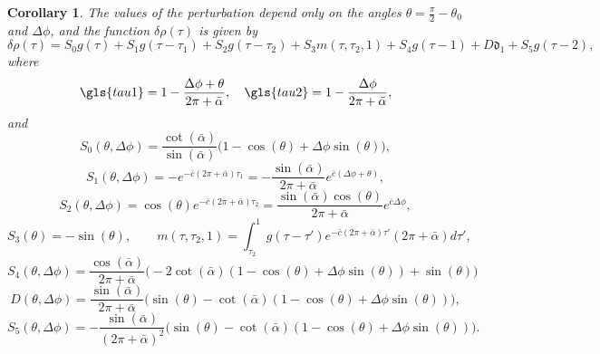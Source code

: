 \documentclass[reqno]{amsart}
\theoremstyle{definition} \newtheorem{definition}{Definition}[section]
\theoremstyle{definition} \newtheorem{remark}[definition]{Remark}
\theoremstyle{plain} \newtheorem{lemma}[definition]{Lemma}
\theoremstyle{plain} \newtheorem{proposition}[definition]{Proposition}
\theoremstyle{plain} \newtheorem{theorem}[definition]{Theorem}
\theoremstyle{plain} \newtheorem{corollary}[definition]{Corollary}
\theoremstyle{definition} \newtheorem{example}[definition]{Example}
\theoremstyle{plain} \newtheorem{claim}[clai]{Claim}
\theoremstyle{definition} \newtheorem{assumption}[definition]{Assumption}
\theoremstyle{definition} \newtheorem{observation}[definition]{Observation}
\newcommand{\1}{\mathbbm 1}
\newcommand{\Diracd}{\mathfrak{d}}
\numberwithin{equation}{section} %
\theoremstyle{plain} \newtheorem*{theorem*}{Theorem}
\theoremstyle{plain} \newtheorem{mthm}[maintheorem]{Main Theorem}
\theoremstyle{plain} \newtheorem*{mthm*}{Main Theorem}
\theoremstyle{plain} \newtheorem*{conjecture*}{Conjecture}
\theoremstyle{plain} \newtheorem{conjecture}[definition]{Conjecture}
\theoremstyle{plain} \newtheorem*{problem*}{Problem}
\begin{document}
\begin{corollary}
\label{Cor:arc_rho_eq}
The values of the perturbation depend only on the angles $\theta = \frac{\pi}{2} - \theta_0$ and $\Delta \phi$, and the function $\delta \rho(\tau)$ is given by
\begin{equation*}
\delta \rho(\tau) = S_0 g(\tau) + S_1 g(\tau - \tau_1) + S_2 g(\tau - \tau_2) + S_3 m(\tau,\tau_2,1) + S_4 g(\tau-1) + D \Diracd_1 + S_5 g(\tau-2),
\end{equation*}
where 
\begin{equation*}
\gls{tau1} = 1 - \frac{\Delta \phi + \theta}{2\pi + \bar \alpha}, \quad \gls{tau2} = 1 - \frac{\Delta \phi}{2\pi + \bar \alpha},
\end{equation*}
and
\begin{equation*}
S_0(\theta,\Delta \phi) = \frac{\cot(\bar \alpha)}{\sin(\bar \alpha)} \big( 1 - \cos(\theta) + \Delta \phi \sin(\theta) \big),
\end{equation*}
\begin{equation*}
S_1(\theta,\Delta \phi) = - e^{- \bar c(2\pi + \bar \alpha) \tau_1} = - \frac{\sin(\bar \alpha)}{2\pi + \bar \alpha} e^{\bar c(\Delta \phi + \theta)},
\end{equation*}
\begin{equation*}
S_2(\theta,\Delta \phi) = \cos(\theta) e^{-\bar c(2\pi + \bar \alpha) \tau_2} = \frac{\sin(\bar \alpha) \cos(\theta)}{2\pi + \bar \alpha} e^{\bar c \Delta \phi},
\end{equation*}
\begin{equation*}
S_3(\theta) = - \sin(\theta), \qquad m(\tau,\tau_2,1) = \int_{\tau_2}^1 g(\tau - \tau') e^{- \bar c(2\pi + \bar \alpha) \tau'} (2\pi + \bar \alpha) d\tau',
\end{equation*}
\begin{equation*}
S_4(\theta,\Delta \phi) = \frac{\cos(\bar \alpha)}{2\pi + \bar \alpha} \Big( - 2 \cot(\bar \alpha) (1 - \cos(\theta) + \Delta \phi \sin(\theta)) + \sin(\theta) \Big)
\end{equation*}
\begin{equation*}
D(\theta,\Delta \phi) = \frac{\sin(\bar \alpha)}{2\pi + \bar \alpha} \big( \sin(\theta) - \cot(\bar \alpha) (1 - \cos(\theta) + \Delta \phi \sin(\theta)) \big), 
\end{equation*}
\begin{equation*}
S_5(\theta,\Delta \phi) = - \frac{\sin(\bar \alpha)}{(2\pi + \bar \alpha)^2} \Big( \sin(\theta) - \cot(\bar \alpha) (1 - \cos(\theta) + \Delta \phi \sin(\theta)) \Big).
\end{equation*}
\end{corollary}
\end{document}
